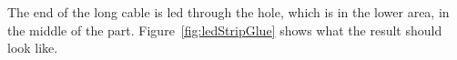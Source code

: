 %

The end of the long cable is led through the hole, which is in the lower area, in the middle of the part. Figure~\ref{fig:ledStripGlue} shows what the result should look like.%

